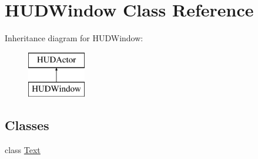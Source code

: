 \hypertarget{class_h_u_d_window}{\section{H\+U\+D\+Window Class Reference}
\label{class_h_u_d_window}
}
Inheritance diagram for H\+U\+D\+Window\+:\begin{figure}[H]
\begin{center}
\leavevmode
\includegraphics[height=2.000000cm]{class_h_u_d_window}
\end{center}
\end{figure}
\subsection*{Classes}
\begin{DoxyCompactItemize}
\item 
class \hyperlink{class_h_u_d_window_1_1_text}{Text}
\end{DoxyCompactItemize}
